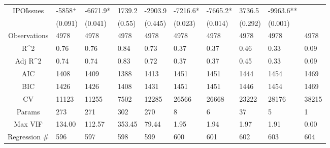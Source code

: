 \documentclass{article}
\begin{document}
\begin{table}[H]
\begin{tabular}{|clllllllll|}
  IPOIssues & -5858$^{+}$ & -6671.9* & 1739.2 & -2903.9 & -7216.6* & -7665.2* & 3736.5 & -9963.6** &  \\ 
   & (0.091) & (0.041) & (0.55) & (0.445) & (0.023) & (0.014) & (0.292) & (0.001) &  \\ 
  \hline 
 Observations & 4978 & 4978 & 4978 & 4978 & 4978 & 4978 & 4978 & 4978 & 4978 \\ 
  R^2 & 0.76 & 0.76 & 0.84 & 0.73 & 0.37 & 0.37 & 0.46 & 0.33 & 0.09 \\ 
  Adj R^2 & 0.74 & 0.74 & 0.83 & 0.72 & 0.37 & 0.37 & 0.45 & 0.33 & 0.09 \\ 
  AIC & 1408 & 1409 & 1388 & 1413 & 1451 & 1451 & 1444 & 1454 & 1469 \\ 
  BIC & 1426 & 1426 & 1408 & 1431 & 1451 & 1451 & 1446 & 1454 & 1469 \\ 
  CV & 11123 & 11255 & 7502 & 12285 & 26566 & 26668 & 23222 & 28176 & 38215 \\ 
  Params & 273 & 271 & 302 & 270 & 8 & 6 & 37 & 5 & 1 \\ 
  Max VIF & 134.00 & 112.57 & 353.45 & 79.44 & 1.95 & 1.94 & 1.97 & 1.91 & 0.00 \\ 
  Regression \# & 596 & 597 & 598 & 599 & 600 & 601 & 602 & 603 & 604 \\ 
   \hline
\end{tabular}
 
\end{table}
\end{document}
